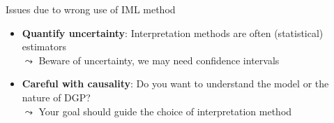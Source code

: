 \documentclass[11pt,compress,t,notes=noshow, aspectratio=169, xcolor=table]{beamer}
\begin{document}
\begin{frame}{Issues due to wrong use of IML method~}
    \begin{itemize}
        \item \textbf{Quantify uncertainty}: Interpretation methods are often (statistical) estimators \\
        $\leadsto$ Beware of uncertainty, we may need confidence intervals\\
        \item<3> \textbf{Careful with causality}:
        Do you want to understand the model or the nature of DGP?\\
        $\leadsto$ Your goal should guide the choice of interpretation method
    \end{itemize}
\end{frame}


\endlecture
\end{document}
